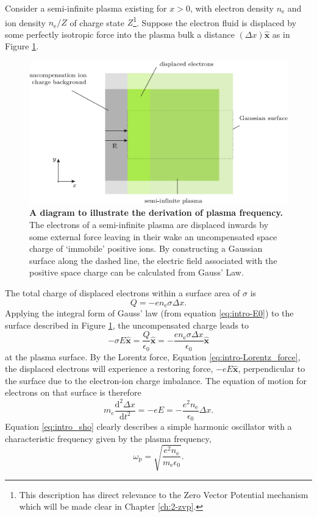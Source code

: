 Consider a semi-infinite plasma existing for $x>0$, with electron density $n_\mathrm{e}$ and ion density $n_\mathrm{e}/Z$ of charge state $Z$\footnote{This description has direct relevance to the Zero Vector Potential mechanism which will be made clear in Chapter \ref{ch:2-zvp}.}. Suppose the electron fluid is displaced by some perfectly isotropic force into the plasma bulk a distance $(\Delta x) \hat{\mathbf{x}}$ as in Figure \ref{fig:introplasmafrequency}. 
\begin{figure}
	\centering
	\includegraphics[width=0.7\linewidth]{figures/intro/intro_plasma_frequency}
	\caption[A diagram to illustrate the derivation of plasma frequency.]{\textbf{A diagram to illustrate the derivation of plasma frequency.} The electrons of a semi-infinite plasma are displaced inwards by some external force leaving in their wake an uncompensated space charge of `immobile' positive ions. By constructing a Gaussian surface along the dashed line, the electric field associated with the positive space charge can be calculated from Gauss' Law.}
	\label{fig:introplasmafrequency}
\end{figure}
The total charge of displaced electrons within a surface area of $\sigma$ is 
\begin{equation}\label{eq:intro_Q}
	Q = -en_\mathrm{e}\sigma\Delta x.
\end{equation}
Applying the integral form of Gauss' law (from equation \ref{eq:intro-E0}) to the surface described in Figure \ref{fig:introplasmafrequency}, the uncompensated charge leads to 
\begin{equation}\label{eq:intro_E}
	-\sigma E\hat{\mathbf{x}}= \frac{Q}{\epsilon_0}\hat{\mathbf{x}} = -\frac{en_\mathrm{e}\sigma\Delta x}{\epsilon_0}\hat{\mathbf{x}}
\end{equation}
at the plasma surface. By the Lorentz force, Equation \ref{eq:intro-Lorentz_force}, the displaced electrons will experience a restoring force, $-eE\hat{\mathbf{x}}$, perpendicular to the surface due to the electron-ion charge imbalance. The equation of motion for electrons on that surface is therefore
\begin{equation}\label{eq:intro_sho}
	m_e\frac{\mathrm{d}^2\Delta x}{\mathrm{d}t^2} = -eE = -\frac{e^2n_\mathrm{e}}{\epsilon_0}\Delta x.
\end{equation}
Equation \ref{eq:intro_sho} clearly describes a simple harmonic oscillator with a characteristic frequency given by the plasma frequency,
\begin{equation}
	\omega_\mathrm{p} = \sqrt{\frac{e^2n_\mathrm{e}}{m_\mathrm{e} \epsilon_0}}.
\end{equation}

